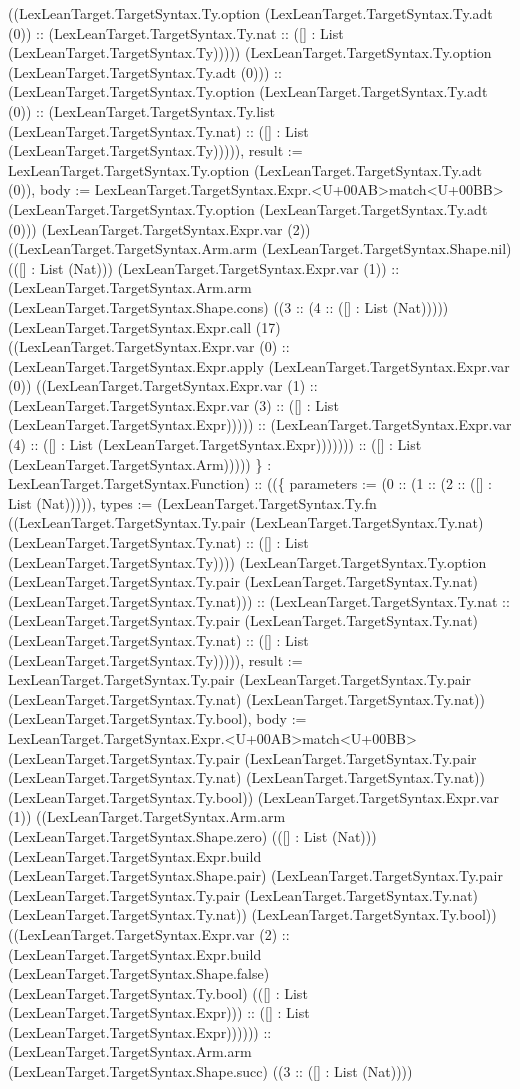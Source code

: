 \documentclass[11pt]{article}
\begin{document}
((LexLeanTarget.TargetSyntax.Ty.option (LexLeanTarget.TargetSyntax.Ty.adt (0)) :: (LexLeanTarget.TargetSyntax.Ty.nat :: ([] : List (LexLeanTarget.TargetSyntax.Ty))))) (LexLeanTarget.TargetSyntax.Ty.option (LexLeanTarget.TargetSyntax.Ty.adt (0))) :: (LexLeanTarget.TargetSyntax.Ty.option (LexLeanTarget.TargetSyntax.Ty.adt (0)) :: (LexLeanTarget.TargetSyntax.Ty.list (LexLeanTarget.TargetSyntax.Ty.nat) :: ([] : List (LexLeanTarget.TargetSyntax.Ty))))), result := LexLeanTarget.TargetSyntax.Ty.option (LexLeanTarget.TargetSyntax.Ty.adt (0)), body := LexLeanTarget.TargetSyntax.Expr.<U+00AB>match<U+00BB> (LexLeanTarget.TargetSyntax.Ty.option (LexLeanTarget.TargetSyntax.Ty.adt (0))) (LexLeanTarget.TargetSyntax.Expr.var (2)) ((LexLeanTarget.TargetSyntax.Arm.arm (LexLeanTarget.TargetSyntax.Shape.nil) (([] : List (Nat))) (LexLeanTarget.TargetSyntax.Expr.var (1)) :: (LexLeanTarget.TargetSyntax.Arm.arm (LexLeanTarget.TargetSyntax.Shape.cons) ((3 :: (4 :: ([] : List (Nat))))) (LexLeanTarget.TargetSyntax.Expr.call (17) ((LexLeanTarget.TargetSyntax.Expr.var (0) :: (LexLeanTarget.TargetSyntax.Expr.apply (LexLeanTarget.TargetSyntax.Expr.var (0)) ((LexLeanTarget.TargetSyntax.Expr.var (1) :: (LexLeanTarget.TargetSyntax.Expr.var (3) :: ([] : List (LexLeanTarget.TargetSyntax.Expr))))) :: (LexLeanTarget.TargetSyntax.Expr.var (4) :: ([] : List (LexLeanTarget.TargetSyntax.Expr))))))) :: ([] : List (LexLeanTarget.TargetSyntax.Arm))))) \} : LexLeanTarget.TargetSyntax.Function) :: ((\{ parameters := (0 :: (1 :: (2 :: ([] : List (Nat))))), types := (LexLeanTarget.TargetSyntax.Ty.fn ((LexLeanTarget.TargetSyntax.Ty.pair (LexLeanTarget.TargetSyntax.Ty.nat) (LexLeanTarget.TargetSyntax.Ty.nat) :: ([] : List (LexLeanTarget.TargetSyntax.Ty)))) (LexLeanTarget.TargetSyntax.Ty.option (LexLeanTarget.TargetSyntax.Ty.pair (LexLeanTarget.TargetSyntax.Ty.nat) (LexLeanTarget.TargetSyntax.Ty.nat))) :: (LexLeanTarget.TargetSyntax.Ty.nat :: (LexLeanTarget.TargetSyntax.Ty.pair (LexLeanTarget.TargetSyntax.Ty.nat) (LexLeanTarget.TargetSyntax.Ty.nat) :: ([] : List (LexLeanTarget.TargetSyntax.Ty))))), result := LexLeanTarget.TargetSyntax.Ty.pair (LexLeanTarget.TargetSyntax.Ty.pair (LexLeanTarget.TargetSyntax.Ty.nat) (LexLeanTarget.TargetSyntax.Ty.nat)) (LexLeanTarget.TargetSyntax.Ty.bool), body := LexLeanTarget.TargetSyntax.Expr.<U+00AB>match<U+00BB> (LexLeanTarget.TargetSyntax.Ty.pair (LexLeanTarget.TargetSyntax.Ty.pair (LexLeanTarget.TargetSyntax.Ty.nat) (LexLeanTarget.TargetSyntax.Ty.nat)) (LexLeanTarget.TargetSyntax.Ty.bool)) (LexLeanTarget.TargetSyntax.Expr.var (1)) ((LexLeanTarget.TargetSyntax.Arm.arm (LexLeanTarget.TargetSyntax.Shape.zero) (([] : List (Nat))) (LexLeanTarget.TargetSyntax.Expr.build (LexLeanTarget.TargetSyntax.Shape.pair) (LexLeanTarget.TargetSyntax.Ty.pair (LexLeanTarget.TargetSyntax.Ty.pair (LexLeanTarget.TargetSyntax.Ty.nat) (LexLeanTarget.TargetSyntax.Ty.nat)) (LexLeanTarget.TargetSyntax.Ty.bool)) ((LexLeanTarget.TargetSyntax.Expr.var (2) :: (LexLeanTarget.TargetSyntax.Expr.build (LexLeanTarget.TargetSyntax.Shape.false) (LexLeanTarget.TargetSyntax.Ty.bool) (([] : List (LexLeanTarget.TargetSyntax.Expr))) :: ([] : List (LexLeanTarget.TargetSyntax.Expr)))))) :: (LexLeanTarget.TargetSyntax.Arm.arm (LexLeanTarget.TargetSyntax.Shape.succ) ((3 :: ([] : List (Nat)))) 
\end{document}
